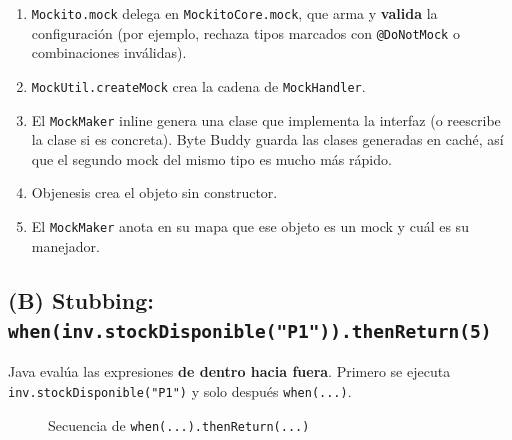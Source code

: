 \documentclass[11pt,a4paper,oneside]{report}
\newcommand{\code}[1]{\texttt{#1}}
\begin{document}
\begin{enumerate}
  \item \code{Mockito.mock} delega en \code{MockitoCore.mock}, que arma y \textbf{valida} la configuración (por ejemplo, rechaza tipos marcados con \code{@DoNotMock} o combinaciones inválidas).
  \item \code{MockUtil.createMock} crea la cadena de \code{MockHandler}.
  \item El \code{MockMaker} inline genera una clase que implementa la interfaz (o reescribe la clase si es concreta). Byte Buddy guarda las clases generadas en caché, así que el segundo mock del mismo tipo es mucho más rápido.
  \item Objenesis crea el objeto sin constructor.
  \item El \code{MockMaker} anota en su mapa que ese objeto es un mock y cuál es su manejador.
\end{enumerate}

\subsection{(B) Stubbing: \code{when(inv.stockDisponible("P1")).thenReturn(5)}}
Java evalúa las expresiones \textbf{de dentro hacia fuera}. Primero se ejecuta \code{inv.stockDisponible("P1")} y solo después \code{when(...)}.

\begin{figure}[H]
\centering
{}
\caption{Secuencia de \code{when(...).thenReturn(...)}}
\end{figure}
\end{document}
